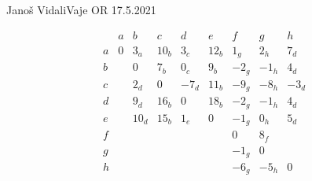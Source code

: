 \begin{naloga}{Janoš Vidali}{Vaje OR 17.5.2021}
\begin{odgovor}
\begin{tabela}
$$
\begin{array}{c|cccccccc}
& a & b & c & d & e & f & g & h \\ \hline
a & 0 & 3_a & 10_b & 3_c & 12_b &  1_g &  2_h &  7_d \\
b & & 0 & 7_b & 0_c & 9_b & -2_g & -1_h &  4_d \\
c & & 2_d & 0 & -7_d & 11_b & -9_g & -8_h & -3_d \\
d & & 9_d & 16_b & 0 & 18_b & -2_g & -1_h & 4_d \\
e & & 10_d & 15_b & 1_e & 0 & -1_g &  0_h & 5_d \\
f & & & & & & 0 & 8_f & \\
g & & & & & & -1_g & 0 & \\
h & & & & & & -6_g & -5_h & 0 \\
\end{array}
$$
\end{tabela}

\end{odgovor}
\end{naloga}

